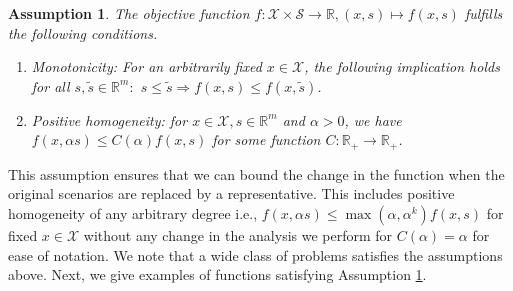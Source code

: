 \documentclass{article}
\newtheorem{assumption}[theorem]{Assumption}
\newcommand{\mX}{\mathcal{X}}
\newcommand{\mS}{\mathcal{S}}
\newcommand{\R}{\mathbb{R}}
\begin{document}
\begin{assumption}
	\label{assump:func_assumps}
	The objective function \(f\colon \mX \times \mS \rightarrow \R, (x,s) \mapsto f(x,s)\) fulfills the following conditions.
	\begin{enumerate}[label= (\roman*)]
		\item Monotonicity: For an arbitrarily fixed \(x\in\mX\), the following implication holds for all \(s,\tilde{s}\in\R^m:\) $s\leq\tilde{s} \Rightarrow f(x,s)\leq f(x,\tilde{s})$.
		\item Positive homogeneity: for \(x\in\mX, s\in\R^m\) and \(\alpha > 0\), we have \(f(x, \alpha s)\leq C(\alpha) f(x,s)\) for some function $C:\R_+ \rightarrow \R_+$. %
	\end{enumerate}
\end{assumption}

This assumption ensures that we can bound the change in the function when the original scenarios are replaced by a representative.
This includes positive homogeneity of any arbitrary degree i.e., \(f(x,\alpha s)\leq \max(\alpha, \alpha^k) f(x,s)\) for fixed $x\in\mX$ without any change in the analysis we perform for $C(\alpha)=\alpha$ for ease of notation.
We note that a wide class of problems satisfies the assumptions above.
Next, we give examples of functions satisfying Assumption \ref{assump:func_assumps}.
\end{document}
